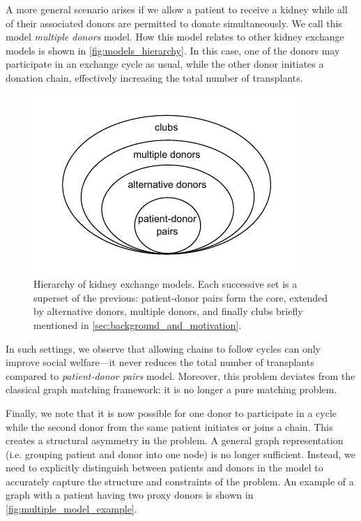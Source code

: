 A more general scenario arises if we allow a patient to receive a kidney while all of their associated donors are permitted to donate simultaneously. We call this model \textit{multiple donors} model. How this model relates to other kidney exchange models is shown in \autoref{fig:models_hierarchy}. In this case, one of the donors may participate in an exchange cycle as usual, while the other donor initiates a donation chain, effectively increasing the total number of transplants.




\begin{figure}
    \centering
    \includegraphics{data/models_hierarchy.pdf}
    \caption[Hierarchy of kidney exchange models]{Hierarchy of kidney exchange models. Each successive set is a superset of the previous: patient-donor pairs form the core, extended by alternative donors, multiple donors, and finally clubs briefly mentioned in \autoref{sec:background_and_motivation}.}
    \label{fig:models_hierarchy}
\end{figure}

In such settings, we observe that allowing chains to follow cycles can only improve social welfare—it never reduces the total number of transplants compared to \textit{patient-donor pairs} model. Moreover, this problem deviates from the classical graph matching framework: it is no longer a pure matching problem.

Finally, we note that it is now possible for one donor to participate in a cycle while the second donor from the same patient initiates or joins a chain. This creates a structural asymmetry in the problem. A general graph representation (i.e. grouping patient and donor into one node) is no longer sufficient. Instead, we need to explicitly distinguish between patients and donors in the model to accurately capture the structure and constraints of the problem. An example of a graph with a patient having two proxy donors is shown in \autoref{fig:multiple_model_example}.

